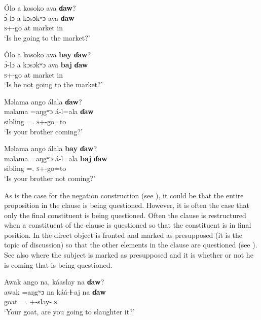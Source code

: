 \ea \label{ex:10:86}
Ólo  a  kosoko  ava  \textbf{ɗaw}?\\
\gll  \'{ɔ}-lɔ    a  kɔsɔkʷɔ  ava  \textbf{ɗaw}\\
      \textsc{s}+{\IFV}-go  at  market  in  {\QUEST}\\
\glt  ‘Is he going to the market?’
\z

\ea \label{ex:10:87}
Ólo  a  kosoko  ava  \textbf{bay}  \textbf{ɗaw}?\\
\gll  \'{ɔ}-lɔ    a  kɔsɔkʷɔ  ava  \textbf{baj}  \textbf{ɗaw}\\
      \textsc{s}+{\IFV}-go  at  market  in  {\NEG}  {\QUEST}\\
\glt  ‘Is he not going to the market?’
\z

\ea \label{ex:10:88}
Məlama  ango  álala  \textbf{ɗaw}?\\
\gll  məlama   =aŋgʷɔ     á-l=ala     \textbf{ɗaw}\\
      sibling  ={\twoS}.{\POSS}  \textsc{s}+{\IFV}-go=to  {\QUEST}\\
\glt  ‘Is your brother coming?’
\z

\largerpage
\ea \label{ex:10:89}
Məlama  ango  álala  \textbf{bay}  \textbf{ɗaw}?\\
\gll  məlama   =aŋgʷɔ     á-l=ala     \textbf{baj}  \textbf{ɗaw}\\
      sibling  ={\twoS}.{\POSS}  \textsc{s}+{\IFV}-go=to  {\NEG}  {\QUEST}\\
\glt  ‘Is your brother not coming?’
\z  

As is the case for the negation construction (see ), it could be that the entire proposition in the clause is being questioned. However, it is often the case that only the final constituent is being questioned. Often the clause is restructured when a constituent of the clause is questioned so that the constituent is in final position. In  the direct object is fronted and marked as presupposed (it is the topic of discussion) so that the other elements in the clause are questioned (see ). See also  where the subject is marked as presupposed and it is whether or not he is coming that is being questioned.

\ea \label{ex:10:90}
Awak  ango  na,  káaslay  na  \textbf{ɗaw}?\\
\gll  awak  =aŋgʷɔ    na  káá-ɬ{}-aj    na  \textbf{ɗaw}\\
      goat    ={\twoS}.{\POSS}  {\PSP}  {\twoS}+{\POT}-slay{}-{\CL}  \textsc{s}.{\DO}  {\QUEST}\\
\glt  ‘Your goat, are you going to slaughter it?’
\z 

